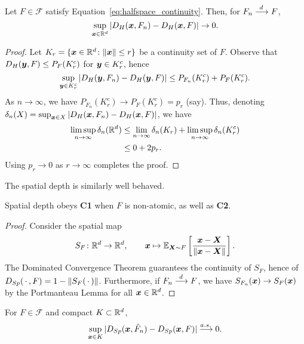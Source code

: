\begin{theorem}\label{thm:halfspace_uniform}
    Let $F \in \mathscr{F}$ satisfy Equation~\ref{eq:halfspace_continuity}.
    Then, for $F_n \overset{d\,}{\longrightarrow} F$,
    \begin{equation}
        \sup_{\bm{x} \in \mathbb{R}^d} |D_H(\bm{x}, F_n) - D_H(\bm{x}, F)| \to 0.
    \end{equation}
\end{theorem}
\begin{proof}
    Let $K_r = \{\bm{x} \in \mathbb{R}^d\colon \Vert \bm{x} \Vert \leq r\}$ be a continuity set
    of $F$.
    Observe that $D_H(\bm{y}, F) \leq P_F(K_r^c)$ for $\bm{y} \in K_r^c$, hence
    \begin{equation}
        \sup_{\bm{y} \in K_r^c} |D_H(\bm{y}, F_n) - D_H(\bm{y}, F)| \leq P_{F_n}(K_r^c) + P_F(K_r^c).
    \end{equation}
    As $n \to \infty$, we have $P_{F_n}(K_r^c) \to P_F(K_r^c) = p_r$ (say).
    Thus, denoting $\delta_n(X) = \sup_{\bm{x} \in X} |D_H(\bm{x}, F_n) - D_H(\bm{x},
    F)|$, we have
    \begin{align}
        \limsup_{n \to \infty} \delta_n(\mathbb{R}^d)
        &\leq \lim_{n \to \infty} \delta_n(K_r) + \limsup_{n \to \infty} \delta_n(K_r^c) \\
        &\leq 0 + 2p_r.
    \end{align}
    Using $p_r \to 0$ as $r \to \infty$ completes the proof.
\end{proof}



The spatial depth is similarly well behaved.

\begin{theorem}
    Spatial depth obeys \textbf{C1} when $F$ is non-atomic, as well as
    \textbf{C2}.
\end{theorem}
\begin{proof}
    Consider the spatial map
    \begin{equation}
        S_F\colon \mathbb{R}^d \to \mathbb{R}^d, \qquad
        \bm{x} \mapsto \operatorname{\mathbb{E}}_{\bm{X} \sim F}\left[\frac{\bm{x} - \bm{X}}{\Vert \bm{x} - \bm{X} \Vert}\right].
    \end{equation}
    The Dominated Convergence Theorem guarantees the continuity of $S_F$,
    hence of $D_{Sp}(\,\cdot\,, F) = 1 - \Vert S_F(\,\cdot\,) \Vert$.
    Furthermore, if $F_n \overset{d\,}{\longrightarrow} F$, we have $S_{F_n}(\bm{x}) \to S_F(\bm{x})$ by the
    Portmanteau Lemma for all $\bm{x} \in \mathbb{R}^d$.
\end{proof}

\begin{theorem}
    For $F \in \mathscr{F}$ and compact $K \subset \mathbb{R}^d$,
    \begin{equation}
        \sup_{\bm{x} \in K} |D_{Sp}(\bm{x}, \hat{F}_n) - D_{Sp}(\bm{x}, F)| \overset{a.s.\,}{\longrightarrow} 0.
    \end{equation}
\end{theorem}

